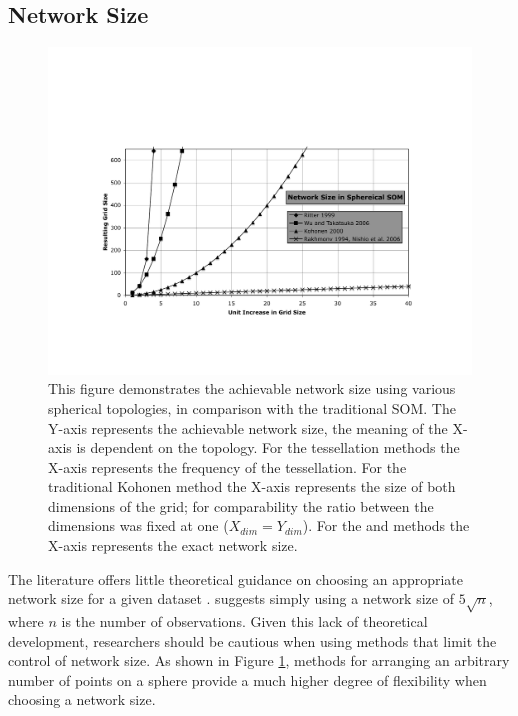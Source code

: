 \documentclass[10pt,titlepage]{article}
\begin{document}
\subsection{Network Size}
\begin{figure}
\centering
\includegraphics[width=\linewidth]{networkSize.pdf}
\caption{This figure demonstrates the achievable network size using various
spherical topologies, in comparison with the traditional SOM. The Y-axis represents the achievable network size, the
meaning of the X-axis is dependent on the topology. For the tessellation
methods the X-axis represents the frequency of the tessellation. For the
traditional Kohonen method the X-axis represents the size of both dimensions of
the grid; for comparability the ratio between the dimensions was fixed at one
($X_{dim}=Y_{dim}$).  For the \cite{Rakhmanov94} and \cite{Nishio:2006fk} methods the X-axis
represents the exact network size.}
\label{fig:nSize}
\end{figure}
The literature offers little theoretical guidance on choosing an appropriate
network size for a given dataset
\citep{cho1996}.  \cite{toolbox} suggests simply using a network size of
\(5\sqrt {n}\), where \(n\) is the number of observations. Given this lack of
theoretical development, researchers should be cautious when using methods that
limit the control of network size.  As shown in Figure \ref{fig:nSize},
methods for arranging an arbitrary number of points on a sphere provide a much
higher degree of flexibility when choosing a network size.
\end{document}
